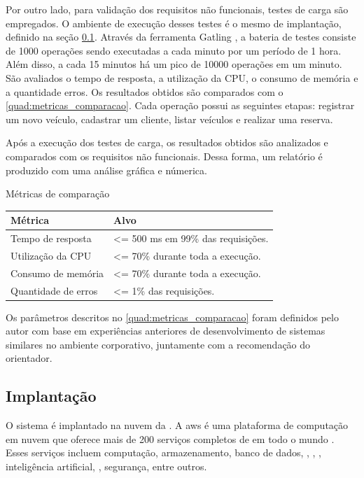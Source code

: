 Por outro lado, para validação dos requisitos não funcionais, testes de carga são empregados. O ambiente de execução desses testes é o mesmo de implantação, definido na seção \ref{section:implantacao}. Através da ferramenta Gatling \cite{gatling}, a bateria de testes consiste de 1000 operações sendo executadas a cada minuto por um período de 1 hora. Além disso, a cada 15 minutos há um pico de 10000 operações em um minuto. São avaliados o tempo de resposta, a utilização da CPU, o consumo de memória e a quantidade erros. Os resultados obtidos são comparados com o \autoref{quad:metricas_comparacao}. Cada operação possui as seguintes etapas: registrar um novo veículo, cadastrar um cliente, listar veículos e realizar uma reserva.

Após a execução dos testes de carga, os resultados obtidos são analizados e comparados com os requisitos não funcionais. Dessa forma, um relatório é produzido com uma análise gráfica e númerica.

\begin{quadro}[H]
    \centering
    \caption{Métricas de comparação}
    \label{quad:metricas_comparacao}
    \begin{tabular}{|p{1.2in}|p{3.5in}|}
    \hline
    
    \textbf{Métrica} & \textbf{Alvo} \\ \hline
    Tempo de resposta & <= 500 ms em 99\% das requisições. \\ \hline
    Utilização da CPU & <= 70\% durante toda a execução. \\ \hline
    Consumo de memória & <= 70\% durante toda a execução. \\ \hline
    Quantidade de erros & <= 1\% das requisições. \\ \hline

    \end{tabular}
\end{quadro}

Os parâmetros descritos no \autoref{quad:metricas_comparacao} foram definidos pelo autor com base em experiências anteriores de desenvolvimento de sistemas similares no ambiente corporativo, juntamente com a recomendação do orientador.

\subsection{Implantação}
\label{section:implantacao}
O sistema é implantado na nuvem da . A \acrshort{aws} é uma plataforma de computação em nuvem que oferece mais de 200 serviços completos de  em todo o mundo \cite{aws}. Esses serviços incluem computação, armazenamento, banco de dados, , , , inteligência artificial, , segurança, entre outros.

